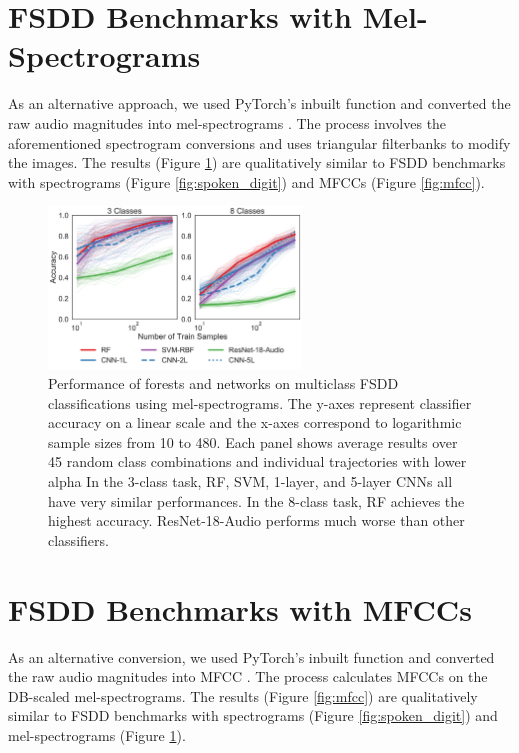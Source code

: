\section{FSDD Benchmarks with Mel-Spectrograms}
\label{app:mel}
As an alternative approach, we used PyTorch’s inbuilt function and converted the raw audio magnitudes into mel-spectrograms \citep{pytorch}. The process involves the aforementioned spectrogram conversions and uses triangular filterbanks to modify the images. The results (Figure \ref{fig:mel}) are qualitatively similar to FSDD benchmarks with spectrograms (Figure \ref{fig:spoken_digit}) and MFCCs (Figure \ref{fig:mfcc}).

\begin{figure}[!htb]
\centering
\includegraphics[width=0.6\textwidth]{figures/mel.pdf}
  \caption{Performance of forests and networks on multiclass FSDD classifications using mel-spectrograms.
  The y-axes represent classifier accuracy on a linear scale and the x-axes correspond to logarithmic sample sizes from 10 to 480. Each panel shows average results over 45 random class combinations and individual trajectories with lower alpha
  In the 3-class task, RF, SVM, 1-layer, and 5-layer CNNs all have very similar performances. In the 8-class task, RF achieves the highest accuracy. ResNet-18-Audio performs much worse than other classifiers.
  }
\label{fig:mel}
\end{figure}
\clearpage

\section{FSDD Benchmarks with MFCCs}
\label{app:mfcc}
As an alternative conversion, we used PyTorch’s inbuilt function and converted the raw audio magnitudes into MFCC \citep{pytorch}. The process calculates MFCCs on the DB-scaled mel-spectrograms. The results (Figure \ref{fig:mfcc}) are qualitatively similar to FSDD benchmarks with spectrograms (Figure \ref{fig:spoken_digit}) and mel-spectrograms (Figure \ref{fig:mel}).

